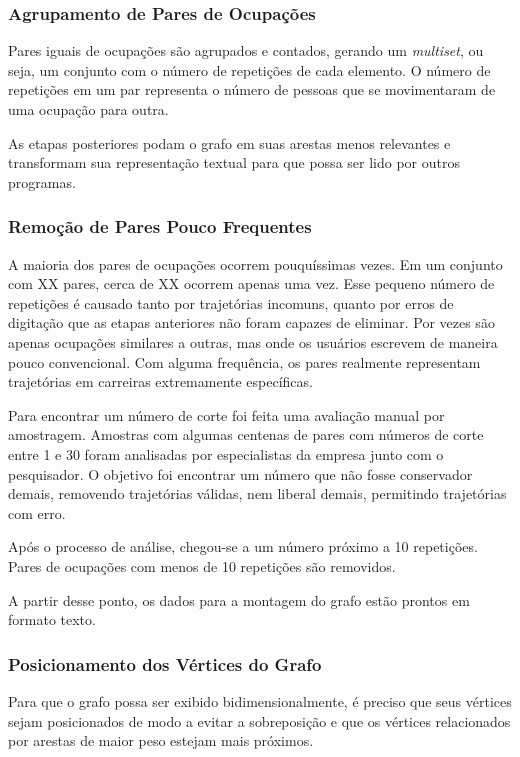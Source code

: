 \documentclass[12pt,a4paper,final]{article}
\begin{document}
\subsubsection{Agrupamento de Pares de Ocupações}

Pares iguais de ocupações são agrupados e contados, gerando um \textit{multiset}, ou seja, um conjunto com o número de repetições de cada elemento. O número de repetições em um par representa o número de pessoas que se movimentaram de uma ocupação para outra.

As etapas posteriores podam o grafo em suas arestas menos relevantes e transformam sua representação textual para que possa ser lido por outros programas.

\subsubsection{Remoção de Pares Pouco Frequentes} \label{sec:grafo-final}

A maioria dos pares de ocupações ocorrem pouquíssimas vezes. Em um conjunto com XX pares, cerca de XX ocorrem apenas uma vez. Esse pequeno número de repetições é causado tanto por trajetórias incomuns, quanto por erros de digitação que as etapas anteriores não foram capazes de eliminar. Por vezes são apenas ocupações similares a outras, mas onde os usuários escrevem de maneira pouco convencional. Com alguma frequência, os pares realmente representam trajetórias em carreiras extremamente específicas.

Para encontrar um número de corte foi feita uma avaliação manual por amostragem. Amostras com algumas centenas de pares com números de corte entre 1 e 30 foram analisadas por especialistas da empresa junto com o pesquisador. O objetivo foi encontrar um número que não fosse conservador demais, removendo trajetórias válidas, nem liberal demais, permitindo trajetórias com erro.

Após o processo de análise, chegou-se a um número próximo a 10 repetições. Pares de ocupações com menos de 10 repetições são removidos.

A partir desse ponto, os dados para a montagem do grafo estão prontos em formato texto.

\subsubsection{Posicionamento dos Vértices do Grafo}

Para que o grafo possa ser exibido bidimensionalmente, é preciso que seus vértices sejam posicionados de modo a evitar a sobreposição e que os vértices relacionados por arestas de maior peso estejam mais próximos.
\end{document}
